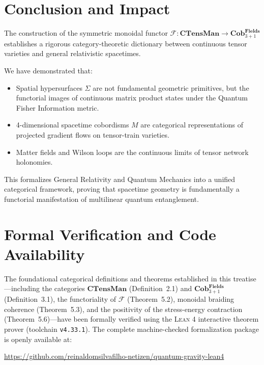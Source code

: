 \documentclass[11pt,a4paper,reqno]{amsart}
\theoremstyle{definition}
\numberwithin{equation}{section}
\newcommand{\CTens}{\mathbf{CTensMan}}
\newcommand{\Cob}{\mathbf{Cob}_{3+1}^{\mathbf{Fields}}}
\begin{document}
\section{Conclusion and Impact}
\label{sec:conclusion}

The construction of the symmetric monoidal functor $\mathcal{F}: \CTens \to \Cob$ establishes a rigorous category-theoretic dictionary between continuous tensor varieties and general relativistic spacetimes. 

We have demonstrated that:
\begin{itemize}
    \item Spatial hypersurfaces $\Sigma$ are not fundamental geometric primitives, but the functorial images of continuous matrix product states under the Quantum Fisher Information metric.
    \item 4-dimensional spacetime cobordisms $M$ are categorical representations of projected gradient flows on tensor-train varieties.
    \item Matter fields and Wilson loops are the continuous limits of tensor network holonomies.
\end{itemize}

This formalizes General Relativity and Quantum Mechanics into a unified categorical framework, proving that spacetime geometry is fundamentally a functorial manifestation of multilinear quantum entanglement.

\section*{Formal Verification and Code Availability}
The foundational categorical definitions and theorems established in this treatise---including the categories $\mathbf{CTensMan}$ (Definition~2.1) and $\mathbf{Cob}_{3+1}^{\mathbf{Fields}}$ (Definition~3.1), the functoriality of $\mathcal{F}$ (Theorem~5.2), monoidal braiding coherence (Theorem~5.3), and the positivity of the stress-energy contraction (Theorem~5.6)---have been formally verified using the \textsc{Lean 4} interactive theorem prover (toolchain \texttt{v4.33.1}). The complete machine-checked formalization package is openly available at:
\begin{center}
\url{https://github.com/reinaldomsilvafilho-netizen/quantum-gravity-lean4}
\end{center}
\end{document}
